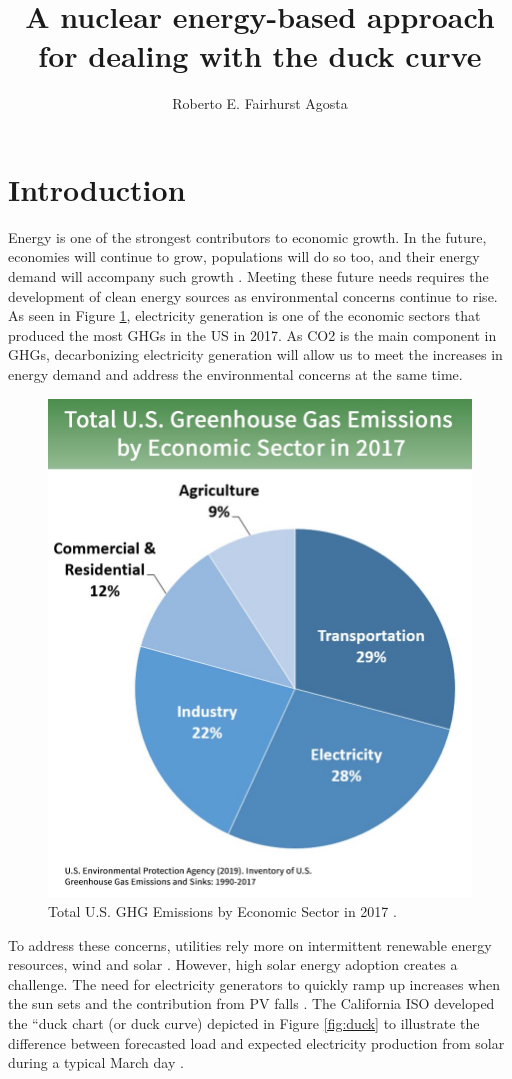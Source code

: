 \documentclass{anstrans}
\title{A nuclear energy-based approach for dealing with the duck curve}
\author{Roberto E. Fairhurst Agosta}
\institute{
University of Illinois at Urbana-Champaign, Dept. of Nuclear, Plasma, and Radiological Engineering\\
ref3@illinois.edu
}
\begin{document}
\section{Introduction}
\label{intro}

Energy is one of the strongest contributors to economic growth.
In the future, economies will continue to grow, populations will do so too, and their energy demand will accompany such growth \cite{burke_impact_2018}.
Meeting these future needs requires the development of clean energy sources as environmental concerns continue to rise.
As seen in Figure \ref{fig:ghg}, electricity generation is one of the economic sectors that produced the most \glspl{GHG} in the \gls{US} in 2017.
As \gls{CO2} is the main component in \glspl{GHG}, decarbonizing electricity generation will allow us to meet the increases in energy demand and address the environmental concerns at the same time.

\begin{figure}[H]
	\centering
	\includegraphics[width=0.7\linewidth]{figures/total-ghg-2019-caption.jpg}
	\hfill
	\caption{Total U.S. GHG Emissions by Economic Sector in 2017 \cite{us_epa_sources_2020}.}
	\label{fig:ghg}
\end{figure}

To address these concerns, utilities rely more on intermittent renewable energy resources, wind and solar \cite{ming_resource_2019}.
However, high solar energy adoption creates a challenge. The need for electricity generators to quickly ramp up increases when the sun sets and the contribution from \gls{PV} falls \cite{us_department_of_energy_confronting_2017}.
The California ISO developed the “duck chart (or duck curve) depicted in Figure \ref{fig:duck} to
illustrate the difference between forecasted load and expected electricity production
from solar during a typical March day \cite{bouillon_prepared_2014}.
\end{document}
